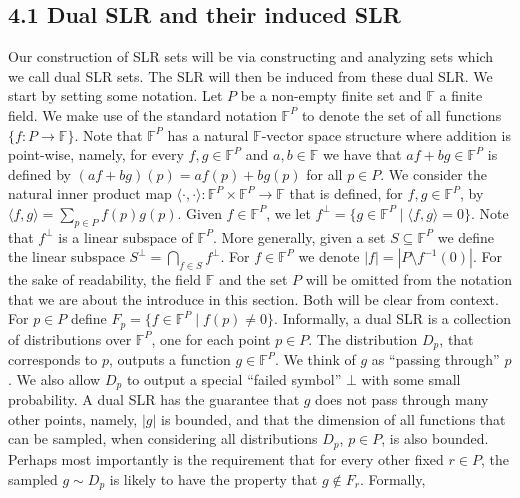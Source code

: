 \subsection*{4.1 Dual SLR and their induced SLR}
Our construction of SLR sets will be via constructing and analyzing sets which we call dual SLR sets. The SLR will then be induced from these dual SLR. We start by setting some notation. Let $P$ be a non-empty finite set and $\mathbb F$ a finite field. We make use of the standard notation $\mathbb F^P$ to denote the set of all functions $\{f:P\to\mathbb F\}$. Note that $\mathbb F^P$ has a natural $\mathbb F$-vector space structure where addition is point-wise, namely, for every $f,g\in\mathbb F^P$ and $a,b\in\mathbb F$ we have that $af+bg\in\mathbb F^P$ is defined by $(af+bg)(p)=af(p)+bg(p)$ for all $p\in P$. We consider the natural inner product map $\langle\cdot,\cdot\rangle:\mathbb F^P\times\mathbb F^P\to\mathbb F$ that is defined, for $f,g\in\mathbb F^P$, by $\langle f,g\rangle=\sum_{p\in P}f(p)g(p)$. Given $f\in\mathbb F^P$, we let $f^\perp=\{g\in\mathbb F^P\mid\langle f,g\rangle=0\}$. Note that $f^\perp$ is a linear subspace of $\mathbb F^P$. More generally, given a set $S\subseteq\mathbb F^P$ we define the linear subspace $S^\perp=\bigcap_{f\in S}f^\perp$. For $f\in\mathbb F^P$ we denote $|f|=|P\setminus f^{-1}(0)|$.
For the sake of readability, the field $\mathbb F$ and the set $P$ will be omitted from the notation that we are about the introduce in this section. Both will be clear from context. For $p\in P$ define $F_p=\{f\in\mathbb F^P\mid f(p)\ne0\}$. Informally, a dual SLR is a collection of distributions over $\mathbb F^P$, one for each point $p\in P$. The distribution $D_p$, that corresponds to $p$, outputs a function $g\in\mathbb F^P$. We think of $g$ as ``passing through'' $p$. We also allow $D_p$ to output a special ``failed symbol'' $\bot$ with some small probability. A dual SLR has the guarantee that $g$ does not pass through many other points, namely, $|g|$ is bounded, and that the dimension of all functions that can be sampled, when considering all distributions $D_p$, $p\in P$, is also bounded. Perhaps most importantly is the requirement that for every other fixed $r\in P$, the sampled $g\sim D_p$ is likely to have the property that $g\notin F_r$. Formally,

